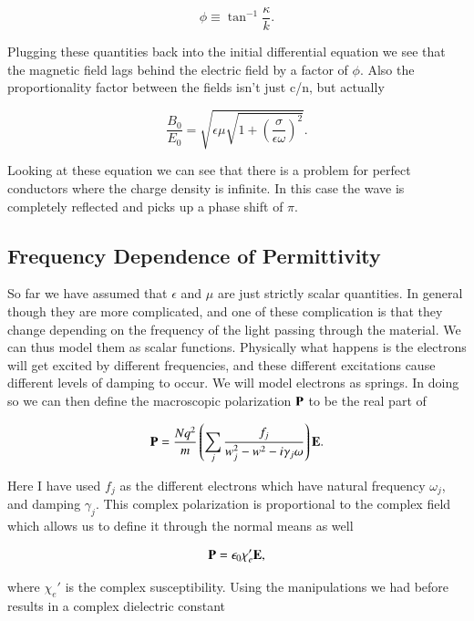 \documentclass[preprint, review,12pt]{elsarticle}
\def\b{\textbf}
\def\={\equiv}
\def\9{\left(}
\def\0{\right)}
\begin{document}
\begin{equation}
    \phi \= \tan^{-1} \frac{\kappa}{k}.
\end{equation}

Plugging these quantities back into the initial differential equation we see that the magnetic field lags behind the electric field by a factor of $\phi.$ Also the proportionality factor between the fields isn't just c/n, but actually

\begin{equation}
    \frac{B_0}{E_0} = \sqrt{\epsilon \mu \sqrt{1 + \9 \frac{\sigma}{\epsilon\omega} \0^2}}.
\end{equation}

Looking at these equation we can see that there is a problem for perfect conductors where the charge density is infinite. In this case the wave is completely reflected and picks up a phase shift of $\pi$.

\subsection{Frequency Dependence of Permittivity}

So far we have assumed that $\epsilon$ and $\mu$ are just strictly scalar quantities. In general though they are more complicated, and one of these complication is that they change depending on the frequency of the light passing through the material. We can thus model them as scalar functions. Physically what happens is the electrons will get excited by different frequencies, and these different excitations cause different levels of damping to occur. We will model electrons as springs. In doing so we can then define the macroscopic polarization $\b P$ to be the real part of

\begin{equation}
    \b P = \frac{Nq^2}{m} \9 \sum_j \frac{f_j}{w_j^2 - w^2 - i \gamma_j \omega} \0 \b E.
\end{equation}

Here I have used $f_j$ as the different electrons which have natural frequency $\omega_j$, and damping $\gamma_j$. This complex polarization is proportional to the complex field which allows us to define it through the normal means as well

\begin{equation}
    \b P = \epsilon_0 \chi_e' \b E,
\end{equation}

where $\chi_e'$ is the complex susceptibility. Using the manipulations we had before results in a complex dielectric constant
\end{document}
